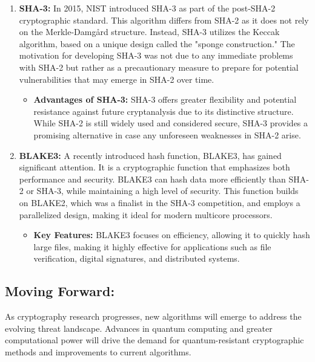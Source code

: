 \documentclass[11pt,a4paper]{article}
\begin{document}
    \begin{enumerate}
        \item \textbf{SHA-3:}
        \newline
        In 2015, NIST introduced SHA-3 as part of the post-SHA-2 cryptographic standard. This algorithm differs from SHA-2 as it does not rely on the Merkle-Damgård structure. Instead, SHA-3 utilizes the Keccak algorithm, based on a unique design called the "sponge construction." The motivation for developing SHA-3 was not due to any immediate problems with SHA-2 but rather as a precautionary measure to prepare for potential vulnerabilities that may emerge in SHA-2 over time.
            \begin{itemize}
                \item \textbf{Advantages of SHA-3:} SHA-3 offers greater flexibility and potential resistance against future cryptanalysis due to its distinctive structure. While SHA-2 is still widely used and considered secure, SHA-3 provides a promising alternative in case any unforeseen weaknesses in SHA-2 arise.

            \end{itemize}

        \item \textbf{BLAKE3:}
        \newline
        A recently introduced hash function, BLAKE3, has gained significant attention. It is a cryptographic function that emphasizes both performance and security. BLAKE3 can hash data more efficiently than SHA-2 or SHA-3, while maintaining a high level of security. This function builds on BLAKE2, which was a finalist in the SHA-3 competition, and employs a parallelized design, making it ideal for modern multicore processors.
            \begin{itemize}
                \item \textbf{Key Features:} BLAKE3 focuses on efficiency, allowing it to quickly hash large files, making it highly effective for applications such as file verification, digital signatures, and distributed systems.

            \end{itemize}

    \end{enumerate}

    \subsection*{Moving Forward:}
    As cryptography research progresses, new algorithms will emerge to address the evolving threat landscape. Advances in quantum computing and greater computational power will drive the demand for quantum-resistant cryptographic methods and improvements to current algorithms.
\end{document}
